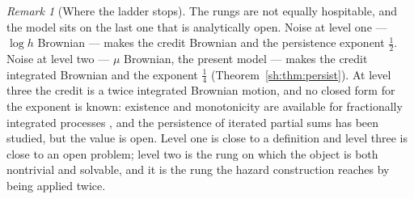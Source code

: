 \documentclass[11pt]{article}
\numberwithin{equation}{section}
\theoremstyle{plain}
\theoremstyle{definition}
\theoremstyle{remark}
\newtheorem{remark}[theorem]{Remark}
\begin{document}
\begin{remark}[Where the ladder stops]\label{gr1:rem:ladderstops}
The rungs are not equally hospitable, and the model sits on the last one
that is analytically open. Noise at level one --- $\log h$ Brownian ---
makes the credit Brownian and the persistence exponent $\tfrac12$. Noise
at level two --- $\mu$ Brownian, the present model --- makes the credit
integrated Brownian and the exponent $\tfrac14$
(Theorem~\ref{sh:thm:persist}). At level three the credit is a twice
integrated Brownian motion, and no closed form for the exponent is
known: existence and monotonicity are available for fractionally
integrated processes \cite{AD13,AS15}, and the persistence of iterated
partial sums has been studied, but the value is open. Level one is close
to a definition and level three is close to an open problem; level two
is the rung on which the object is both nontrivial and solvable, and it
is the rung the hazard construction reaches by being applied twice.
\end{remark}
\end{document}
